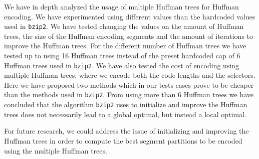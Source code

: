 \documentclass{article}
\begin{document}
We have in depth analyzed the usage of multiple Huffman trees for Huffman encoding. We have experimented using different values than the hardcoded values used in \texttt{bzip2}. We have tested changing the values on the amount of Huffman trees, the size of the Huffman encoding segments and the amount of iterations to improve the Huffman trees.
For the different number of Huffman trees we have tested up to using 16 Huffman trees instead of the preset hardcoded cap of 6 Huffman trees used in \texttt{bzip2}. We have also tested the cost of encoding using multiple Huffman trees, where we encode both the code lengths and the selectors. Here we have proposed two methods which in our tests cases prove to be cheaper than the methods used in \texttt{bzip2}. From using more than 6 Huffman trees we have concluded that the algorithm \texttt{bzip2} uses to initialize and improve the Huffman trees does not necessarily lead to a global optimal, but instead a local optimal.

For future research, we could address the issue of initializing and improving the Huffman trees in order to compute the best segment partitions to be encoded using the multiple Huffman trees.


\newpage
\printbibliography %

\newpage


\appendix
\end{document}
